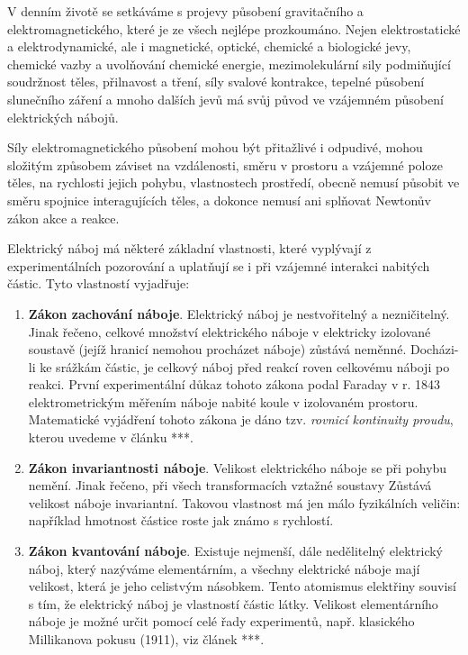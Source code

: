     V denním životě se setkáváme s projevy působení gravitačního a elektromagnetického, které je ze
    všech nejlépe prozkoumáno. Nejen elektrostatické a elektrodynamické, ale i magnetické, optické,
    chemické a biologické jevy, chemické vazby a uvolňování chemické energie, mezimolekulární sily
    podmiňující soudržnost těles, přilnavost a tření, síly svalové kontrakce, tepelné působení
    slunečního záření a mnoho dalších jevů má svůj původ ve vzájemném působení elektrických nábojů.
    
    Síly elektromagnetického působení mohou být přitažlivé i odpudivé, mohou složitým způsobem
    záviset na vzdálenosti, směru v prostoru a vzájemné poloze těles, na rychlosti jejich pohybu,
    vlastnostech prostředí, obecně nemusí působit ve směru spojnice interagujících těles, a dokonce
    nemusí ani splňovat Newtonův zákon akce a reakce.
    
    Elektrický náboj má některé základní vlastnosti, které vyplývají z experimentálních pozorování a
    uplatňují se i při vzájemné interakci nabitých částic. Tyto vlastností vyjadřuje: 
    
    \begin{enumerate}[noitemsep]
      \item \textbf{Zákon zachování náboje}. Elektrický náboj je nestvořitelný a nezničitelný. Jinak
            řečeno, celkové množství elektrického náboje v elektricky izolované soustavě (jejíž
            hranicí nemohou procházet náboje) zůstává neměnné. Docházi-li ke srážkám částic, je
            celkový náboj před reakcí roven celkovému náboji po reakci. První experimentální důkaz
            tohoto zákona podal Faraday v r. 1843 elektrometrickým měřením náboje nabité koule v
            izolovaném prostoru. Matematické vyjádření tohoto zákona je dáno tzv. \emph{rovnicí
            kontinuity proudu}, kterou uvedeme v článku ***. %
      \item \textbf{Zákon invariantnosti náboje}. Velikost elektrického náboje se při pohybu nemění.
            Jinak řečeno, při všech transformacích vztažné soustavy Zůstává velikost náboje
            invariantní. Takovou vlastnost má jen málo fyzikálních veličin: například hmotnost
            částice roste jak známo s rychlostí.
      \item \textbf{Zákon kvantování náboje}. Existuje nejmenší, dále nedělitelný elektrický náboj,
            který nazýváme elementárním, a všechny elektrické náboje mají velikost, která je jeho
            celistvým násobkem. Tento atomismus elektřiny souvisí s tím, že elektrický náboj je
            vlastností částic látky. Velikost elementárního náboje je možné určit pomocí celé řady
            experimentů, např. klasického Millikanova pokusu (1911), viz článek ***. %
    \end{enumerate}

